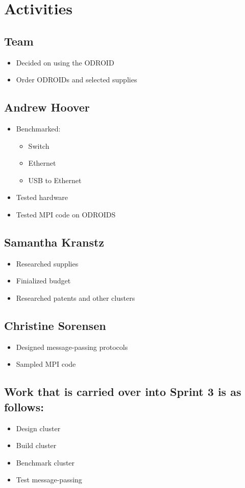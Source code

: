 \documentclass{article}
\begin{document}
{\section*{Activities}
\subsection*{Team}
\begin{itemize}
	\item Decided on using the ODROID
	\item Order ODROIDs and selected supplies
\end{itemize}

\subsection*{Andrew Hoover}
\begin{itemize}
	\item Benchmarked:
		\begin{itemize}
			\item Switch
			\item Ethernet
			\item USB to Ethernet
		\end{itemize}
	\item Tested hardware
	\item Tested MPI code on ODROIDS
\end{itemize}
\subsection*{Samantha Kranstz}
\begin{itemize}
	\item Researched supplies
	\item Finialized budget
	\item Researched patents and other clusters
\end{itemize}
\subsection*{Christine Sorensen}
\begin{itemize}
	\item Designed message-passing protocols
	\item Sampled MPI code
\end{itemize}

\subsection*{Work that is carried over into Sprint 3 is as follows:}
\begin{itemize}
	\item Design cluster
	\item Build cluster
	\item Benchmark cluster
	\item Test message-passing
\end{itemize}

}
\end{document}

